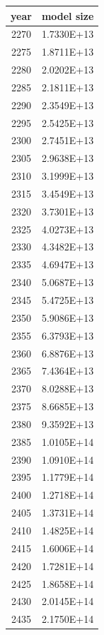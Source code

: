 \documentclass[a4paper]{article}
\begin{document}
    \begin{tabular}{| c | c |}
    	\hline
    	year & model size \\\hline
    	2270 & 1.7330E+13 \\\hline
    	2275 & 1.8711E+13 \\\hline
    	2280 & 2.0202E+13 \\\hline
    	2285 & 2.1811E+13 \\\hline
    	2290 & 2.3549E+13 \\\hline
    	2295 & 2.5425E+13 \\\hline
    	2300 & 2.7451E+13 \\\hline
    	2305 & 2.9638E+13 \\\hline
    	2310 & 3.1999E+13 \\\hline
    	2315 & 3.4549E+13 \\\hline
    	2320 & 3.7301E+13 \\\hline
    	2325 & 4.0273E+13 \\\hline
    	2330 & 4.3482E+13 \\\hline
    	2335 & 4.6947E+13 \\\hline
    	2340 & 5.0687E+13 \\\hline
    	2345 & 5.4725E+13 \\\hline
    	2350 & 5.9086E+13 \\\hline
    	2355 & 6.3793E+13 \\\hline
    	2360 & 6.8876E+13 \\\hline
    	2365 & 7.4364E+13 \\\hline
    	2370 & 8.0288E+13 \\\hline
    	2375 & 8.6685E+13 \\\hline
    	2380 & 9.3592E+13 \\\hline
    	2385 & 1.0105E+14 \\\hline
    	2390 & 1.0910E+14 \\\hline
    	2395 & 1.1779E+14 \\\hline
    	2400 & 1.2718E+14 \\\hline
    	2405 & 1.3731E+14 \\\hline
    	2410 & 1.4825E+14 \\\hline
    	2415 & 1.6006E+14 \\\hline
    	2420 & 1.7281E+14 \\\hline
    	2425 & 1.8658E+14 \\\hline
    	2430 & 2.0145E+14 \\\hline
    	2435 & 2.1750E+14 \\\hline

\end{tabular}
\end{document}

